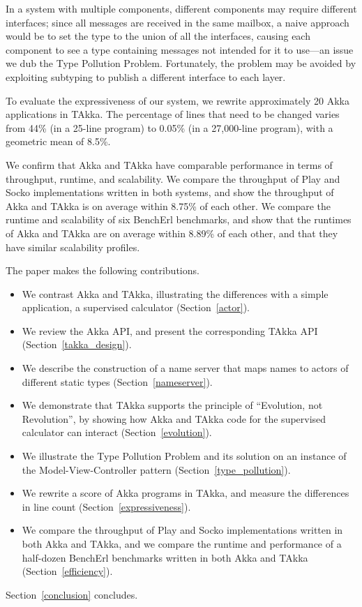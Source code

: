 In a system with multiple components, different components may require
different interfaces; since all messages are received in the same
mailbox, a naive approach would be to set the type to the union of all
the interfaces, causing each component to see a type containing
messages not intended for it to use---an issue we dub the Type Pollution
Problem.  Fortunately, the problem may be avoided by exploiting
subtyping to publish a different interface to each layer.

To evaluate the expressiveness of our system, we rewrite approximately 
20 Akka applications in TAkka.  The percentage of lines that need to be
changed varies from 44\% (in a 25-line program) to 0.05\% (in a
27,000-line program), with a geometric mean of 8.5\%.

We confirm that Akka and TAkka have comparable performance in terms of
throughput, runtime, and scalability.  We compare the throughput of
Play and Socko implementations written in both systems, and show the
throughput of Akka and TAkka is on average within 8.75\% of each
other.  We compare the runtime and scalability of six BenchErl
benchmarks, and show that the runtimes of Akka and TAkka are on
average within 8.89\% of each other, and that they have similar
scalability profiles.

The paper makes the following contributions.

\begin{itemize}\setlength{\itemsep}{0pt}
\item We contrast Akka and TAkka, illustrating the differences with a
  simple application, a supervised calculator (Section~\ref{actor}).

\item We review the Akka API, and present the corresponding TAkka API
  (Section~\ref{takka_design}).

\item We describe the construction of a name server that maps names to
  actors of different static types (Section~\ref{nameserver}).

\item We demonstrate that TAkka supports the principle of
  ``Evolution, not Revolution'', by showing how Akka and TAkka code
  for the supervised calculator can interact (Section~\ref{evolution}).

\item We illustrate the Type Pollution Problem and its solution
  on an instance of the Model-View-Controller pattern (Section~\ref{type_pollution}).

\item We rewrite a score of Akka programs in TAkka, and measure the
  differences in line count (Section~\ref{expressiveness}).

\item We compare the throughput of Play and Socko implementations
  written in both Akka and TAkka, and we compare the runtime and
  performance of a half-dozen BenchErl benchmarks written in both
  Akka and TAkka (Section~\ref{efficiency}).
\end{itemize}
Section~\ref{conclusion} concludes.


